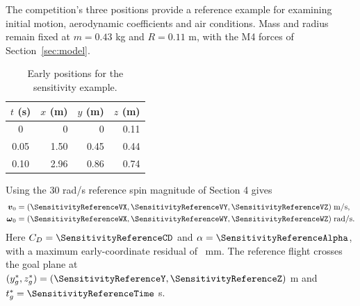 The competition's three positions provide a reference example for examining initial motion, aerodynamic coefficients and air conditions. Mass and radius remain fixed at $m=0.43$ kg and $R=0.11$ m, with the M4 forces of Section~\ref{sec:model}.
\begin{table}[H]\centering\small
\caption{Early positions for the sensitivity example.}\label{tab:sensitivity-reference}
\begin{tabular}{crrr}\toprule
$t$ (s) & $x$ (m) & $y$ (m) & $z$ (m)\\\midrule
0 & 0 & 0 & 0.11\\
0.05 & 1.50 & 0.45 & 0.44\\
0.10 & 2.96 & 0.86 & 0.74\\\bottomrule
\end{tabular}\end{table}
Using the 30 rad/s reference spin magnitude of Section 4 gives
\begin{equation}\begin{aligned}
\boldsymbol v_0&=(\SensitivityReferenceVX,\SensitivityReferenceVY,\SensitivityReferenceVZ)\;\mathrm{m/s},\\
\boldsymbol\omega_0&=(\SensitivityReferenceWX,\SensitivityReferenceWY,\SensitivityReferenceWZ)\;\mathrm{rad/s}.
\end{aligned}\label{eq:sensitivity-reference-state}\end{equation}
Here $C_D=\SensitivityReferenceCD$ and $\alpha=\SensitivityReferenceAlpha$, with a maximum early-coordinate residual of \SensitivityReferenceResidual\ mm. The reference flight crosses the goal plane at $(y_g^*,z_g^*)=(\SensitivityReferenceY,\SensitivityReferenceZ)$ m and $t_g^*=\SensitivityReferenceTime$ s.

